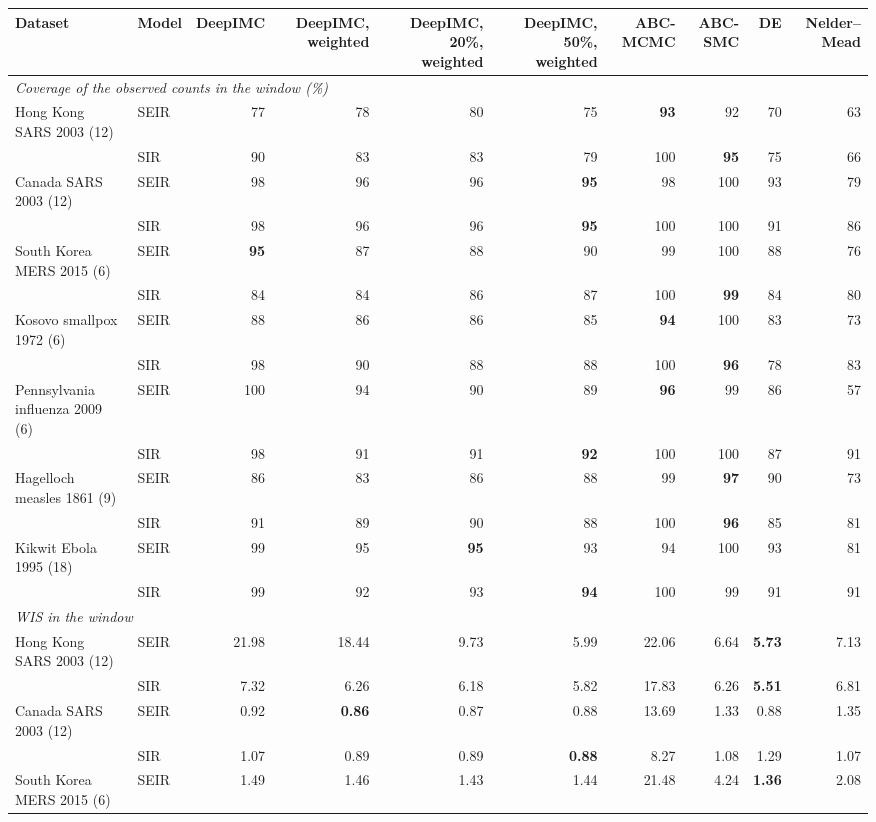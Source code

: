 \begin{tabular}{llrrrrrrrr}
\toprule
Dataset & Model & DeepIMC & DeepIMC, weighted & DeepIMC, 20\%, weighted & DeepIMC, 50\%, weighted & ABC-MCMC & ABC-SMC & DE & Nelder--Mead \\
\midrule
\multicolumn{10}{l}{\textit{Coverage of the observed counts in the window (\%)}} \\
Hong Kong SARS 2003 (12) & SEIR & 77 & 78 & 80 & 75 & \textbf{93} & 92 & 70 & 63 \\
 & SIR & 90 & 83 & 83 & 79 & 100 & \textbf{95} & 75 & 66 \\
Canada SARS 2003 (12) & SEIR & 98 & 96 & 96 & \textbf{95} & 98 & 100 & 93 & 79 \\
 & SIR & 98 & 96 & 96 & \textbf{95} & 100 & 100 & 91 & 86 \\
South Korea MERS 2015 (6) & SEIR & \textbf{95} & 87 & 88 & 90 & 99 & 100 & 88 & 76 \\
 & SIR & 84 & 84 & 86 & 87 & 100 & \textbf{99} & 84 & 80 \\
Kosovo smallpox 1972 (6) & SEIR & 88 & 86 & 86 & 85 & \textbf{94} & 100 & 83 & 73 \\
 & SIR & 98 & 90 & 88 & 88 & 100 & \textbf{96} & 78 & 83 \\
Pennsylvania influenza 2009 (6) & SEIR & 100 & 94 & 90 & 89 & \textbf{96} & 99 & 86 & 57 \\
 & SIR & 98 & 91 & 91 & \textbf{92} & 100 & 100 & 87 & 91 \\
Hagelloch measles 1861 (9) & SEIR & 86 & 83 & 86 & 88 & 99 & \textbf{97} & 90 & 73 \\
 & SIR & 91 & 89 & 90 & 88 & 100 & \textbf{96} & 85 & 81 \\
Kikwit Ebola 1995 (18) & SEIR & 99 & 95 & \textbf{95} & 93 & 94 & 100 & 93 & 81 \\
 & SIR & 99 & 92 & 93 & \textbf{94} & 100 & 99 & 91 & 91 \\
\midrule
\multicolumn{10}{l}{\textit{WIS in the window}} \\
Hong Kong SARS 2003 (12) & SEIR & 21.98 & 18.44 & 9.73 & 5.99 & 22.06 & 6.64 & \textbf{5.73} & 7.13 \\
 & SIR & 7.32 & 6.26 & 6.18 & 5.82 & 17.83 & 6.26 & \textbf{5.51} & 6.81 \\
Canada SARS 2003 (12) & SEIR & 0.92 & \textbf{0.86} & 0.87 & 0.88 & 13.69 & 1.33 & 0.88 & 1.35 \\
 & SIR & 1.07 & 0.89 & 0.89 & \textbf{0.88} & 8.27 & 1.08 & 1.29 & 1.07 \\
South Korea MERS 2015 (6) & SEIR & 1.49 & 1.46 & 1.43 & 1.44 & 21.48 & 4.24 & \textbf{1.36} & 2.08 \\

\end{tabular}
